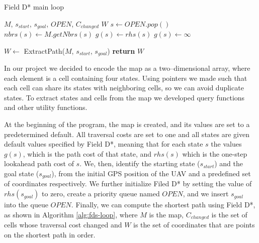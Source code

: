 \begin{algorithm}
	\algrenewcommand{}
	\algrenewcommand{}
	\caption{Field D* main loop}\label{alg:fds-loop}
	\begin{algorithmic}[1]
		\Require $M$, $s_{start}$, $s_{goal}$, $OPEN$, $C_{changed}$
		\Ensure $W$
				\State {}
			\EndFor
		\EndFor
			\State $s \gets OPEN.pop()$
			\State $nbrs(s) \gets M.getNbrs(s)$
				\State $g(s) \gets rhs(s)$ 
					\State {}
				\EndFor
			\Else
				\State $g(s) \gets \infty$
					\State {}
				\EndFor

			\EndIf
		\EndWhile
		\State $W \gets $ ExtractPath($M$, $s_{start}$, $s_{goal}$)
		\State \textbf{return} $W$
	\end{algorithmic}
\end{algorithm}

In our project we decided to encode the map as a two--dimensional array, where each element is 
a cell containing four states. Using pointers we made such that each cell can share its states
with neighboring cells, so we can avoid duplicate states. To extract states and cells from the 
map we developed query functions and other utility functions. 

At the beginning of the program, the map is created, and its values are set to a predetermined
default. All traversal costs are set to one and all states are given default values specified 
by Field D*, meaning that for each state $s$ the values $g(s)$, which is the path cost of 
that state, and $rhs(s)$ which is the one-step lookahead path cost of $s$. We, then,
identify the starting state ($s_{start}$) and the goal state ($s_{goal}$), from the 
initial GPS position of the UAV and a predefined set of coordinates respectively. We further
initialize Filed D* by setting the value of $rhs(s_{goal})$ to zero, create a priority queue
named $OPEN$, and we insert $s_{goal}$ into the queue $OPEN$. Finally, we can compute the 
shortest path using Field D*, as shown in Algorithm \ref{alg:fds-loop}, where $M$ is
the map, $C_{changed}$ is the set of cells whose traversal cost changed and $W$ is the 
set of coordinates that are points on the shortest path in order.

